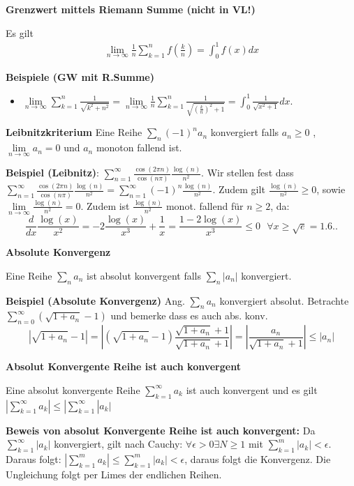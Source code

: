 \documentclass[25pt]{sciposter}
\newenvironment{method}[1]{\begin{mdframed}[backgroundcolor=blue!10,innertopmargin=15pt, innerbottommargin=15pt, nobreak=true]
		\textbf{#1 }
	}
	{ 
	\end{mdframed}
}
\begin{document}
\begin{multicols}{3}
\begin{method}{Grenzwert mittels Riemann Summe (nicht in VL!)}
	Es gilt 
	\begin{align*}
		\lim\limits_{n \to \infty} \frac{1}{n} \sum_{k=1}^{n} f \left( \frac{k}{n} \right) = \int_{0}^{1} f(x) dx
	\end{align*}	
\end{method}
\textbf{Beispiele (GW mit R.Summe)}
\begin{itemize}
	\item $\lim\limits_{n \to \infty} \sum_{k=1}^{n} \frac{1}{\sqrt{k^2 + n^2}} = \lim\limits_{n \to \infty} \frac{1}{n} \sum_{k=1}^{n} \frac{1}{\sqrt{\left(\frac{k}{n}\right)^2 + 1}} = \int_0 ^1 \frac{1}{\sqrt{x^2 + 1}} dx$. 
\end{itemize}

\begin{method}{Leibnitzkriterium} Eine Reihe $\sum_n (-1)^n a_n$ konvergiert falls $a_n \geq 0$ , $\lim\limits_{n \to \infty } a_n = 0$ und $a_n$ monoton fallend ist.
\end{method}

\textbf{Beispiel (Leibnitz)}: $\sum_{n = 1}^{\infty} \frac{\cos(2\pi n)}{\cos(n \pi)} \frac{\log(n)}{n^2}$. Wir stellen fest dass $\sum_{n = 1}^{\infty} \frac{\cos(2\pi n)}{\cos(n \pi)} \frac{\log(n)}{n^2} = \sum_{n = 1}^{\infty} (-1)^n \frac{\log(n)}{n^2}$. Zudem gilt $\frac{\log(n)}{n^2} \geq 0$, sowie $\lim\limits_{n \to \infty} \frac{\log(n)}{n^2} = 0$. Zudem ist $\frac{\log(n)}{n^2}$ monot. fallend für $n \geq 2$, da: 
$$ \frac{d}{dx} \frac{\log(x)}{x^2} = -2 \frac{\log(x)}{x^3} + \frac{1}{x} = \frac{1- 2\log(x)}{x^3} \leq 0\text{ } \forall x \geq \sqrt{e} = 1.6..$$





\begin{method}{Absolute Konvergenz}
	Eine Reihe $\sum_{n} a_n$ ist absolut konvergent falls $\sum_{n} |a_n|$ konvergiert.
\end{method}

\textbf{Beispiel (Absolute Konvergenz)} Ang. $\sum_{n} a_n$ konvergiert absolut. Betrachte $\sum_{n=0}^{\infty} (\sqrt{1 + a_n} -1)$ und bemerke dass es auch abs. konv.
$$\left|\sqrt{1 + a_n} -1\right| = \left| (\sqrt{1 + a_n} -1) \frac{\sqrt{1 + a_n} +1}{\sqrt{1 + a_n} +1} \right| = \left| \frac{a_n}{\sqrt{1 + a_n} + 1} \right| \leq |a_n|$$


\begin{method}{Absolut Konvergente Reihe ist auch konvergent}
Eine absolut konvergente Reihe $\sum _{k=1} ^{\infty} a_k$ ist auch konvergent und es gilt $\left|\sum_{k=1}^{\infty} a_k \right| \leq |\sum_{k=1}^{\infty} |a_k|$
\end{method}
\textbf{Beweis von absolut Konvergente Reihe ist auch konvergent:} Da $\sum_{k=1}^{\infty} |a_k|$ konvergiert, gilt nach Cauchy: $\forall \epsilon > 0 \exists N \geq 1$ mit $\sum_{k=1}^{m} |a_k| < \epsilon$. Daraus folgt: $\left| \sum_{k=1}^{m} a_k \right| \leq \sum_{k=1}^{m} |a_k| < \epsilon$, daraus folgt die Konvergenz. Die Ungleichung folgt per Limes der endlichen Reihen.


\end{multicols}
\end{document}
